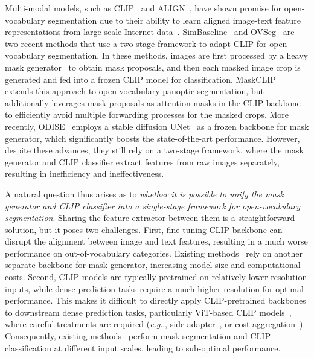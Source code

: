 \documentclass{article}
\makeatletter
\DeclareRobustCommand\onedot{\futurelet\@let@token\@onedot}
\def\@onedot{\ifx\@let@token.\else.\null\fi\xspace}
\def\eg{\emph{e.g}\onedot}
\makeatother
\begin{document}
Multi-modal models, such as CLIP~\cite{radford2021learning} and ALIGN~\cite{jia2021scaling}, have shown promise for open-vocabulary segmentation due to their ability to learn aligned image-text feature representations from large-scale Internet data~\cite{schuhmann2022laion}. 
SimBaseline~\cite{xu2021simple} and OVSeg~\cite{liang2022open} are two recent methods that use a two-stage framework to adapt CLIP for open-vocabulary segmentation.
In these methods, images are first processed by a heavy mask generator~\cite{he2017mask,cheng2021masked} to obtain mask proposals, and then each masked image crop is generated and fed into a frozen CLIP model for classification.
MaskCLIP~\cite{ding2022open} extends this approach to open-vocabulary panoptic segmentation, but additionally leverages mask proposals as attention masks in the CLIP backbone to efficiently avoid multiple forwarding processes for the masked crops.
More recently, ODISE~\cite{xu2023open} employs a stable diffusion UNet~\cite{ronneberger2015u,rombach2022high} as a frozen backbone for mask generator, which significantly boosts the state-of-the-art performance. However, despite these advances, they still rely on a two-stage framework, where the mask generator and CLIP classifier extract features from raw images separately, resulting in inefficiency and ineffectiveness.

A natural question thus arises as to \textit{whether it is possible to unify the mask generator and CLIP classifier into a single-stage framework for open-vocabulary segmentation}.
Sharing the feature extractor between them is a straightforward solution, but it poses two challenges.
First, fine-tuning CLIP backbone can disrupt the alignment between image and text features, resulting in a much worse performance on out-of-vocabulary categories.
Existing methods~\cite{xu2021simple,liang2022open,ding2022open,xu2023open} rely on another separate backbone for mask generator, increasing model size and computational costs.
Second, CLIP models are typically pretrained on relatively lower-resolution inputs, while dense prediction tasks require a much higher resolution for optimal performance.
This makes it difficult to directly apply CLIP-pretrained backbones to downstream dense prediction tasks, particularly ViT-based CLIP models~\cite{dosovitskiy2020image}, where careful treatments are required (\eg, side adapter~\cite{chen2023vision,xu2023side}, or cost aggregation~\cite{zhou2022extract,cho2023cat}).
Consequently, existing methods~\cite{ding2022open,xu2023open} perform mask segmentation and CLIP classification at different input scales, leading to sub-optimal performance.
\end{document}
